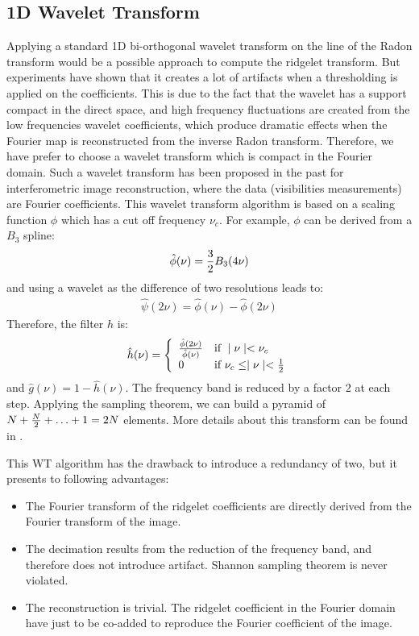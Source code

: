 \documentclass{article}
\begin{document}
\subsection{1D Wavelet Transform}
Applying a standard 1D bi-orthogonal wavelet transform on the 
line of the Radon transform would be a possible approach to compute the
ridgelet transform. But experiments have shown that it creates
a lot of artifacts when a thresholding is applied on the coefficients.
This is due to the fact that the wavelet has a support compact in the direct 
space, and high frequency fluctuations are created from the low frequencies
wavelet coefficients, which produce dramatic effects when the Fourier 
map is reconstructed from the inverse Radon transform. Therefore, 
we have prefer to choose a wavelet transform which is compact in the
Fourier domain. Such a wavelet transform has been proposed in the past 
\cite{starck:sta94_3,starck:book98} for interferometric image reconstruction,
where the data (visibilities measurements) are Fourier coefficients.
This wavelet transform algorithm is based on a scaling function $\phi$ which
has a cut off frequency $\nu_c$. 
For example, $\phi$ can be derived from a $B_3$ spline:
\begin{eqnarray}
\hat{\phi}(\nu)={3\over 2}B_3(4\nu)
\end{eqnarray}
and using a wavelet as the difference of two resolutions leads to:
\begin{eqnarray}
\hat \psi(2\nu) = \hat \phi(\nu) - \hat \phi(2\nu)
\end{eqnarray}
Therefore, the filter $h$ is:
\begin{eqnarray}
\hat h(\nu)= \left\{
  \begin{array}{ll}
  {\hat{\phi}(2\nu)\over \hat{\phi}(\nu)} & \mbox{if } \mid \nu \mid < \nu_c \\
0 & \mbox{if } \nu_c  \leq \mid \nu \mid < {1\over 2} 
  \end{array}
  \right.
\end{eqnarray}
and $\hat g(\nu) = 1 - \hat h(\nu)$.
The frequency band is reduced by a factor $2$ at each step.
Applying the sampling theorem, we can build a pyramid  of
$N+{N\over 2}+\ldots+1=2N$ elements. More details about this transform can 
be found in \cite{starck:book98}.

This WT algorithm has the drawback to introduce a redundancy of two,
but it presents to following advantages:
\begin{itemize}
\item The Fourier transform of the ridgelet coefficients are directly
derived from the Fourier transform of the image.
\item The decimation results from the reduction of the frequency band,
and therefore does not introduce artifact. Shannon sampling theorem is
never violated.
\item The reconstruction is trivial. The ridgelet coefficient in the Fourier
domain have just to be co-added to reproduce the Fourier coefficient of the image.
\end{itemize}
 
\end{document}
